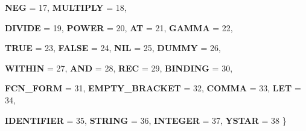 \begin{DoxyCompactItemize}
{\bfseries NEG} =  17, 
{\bfseries MULTIPLY} =  18, 
\par
{\bfseries DIVIDE} =  19, 
{\bfseries POWER} =  20, 
{\bfseries AT} =  21, 
{\bfseries GAMMA} =  22, 
\par
{\bfseries TRUE} =  23, 
{\bfseries FALSE} =  24, 
{\bfseries NIL} =  25, 
{\bfseries DUMMY} =  26, 
\par
{\bfseries WITHIN} =  27, 
{\bfseries AND} =  28, 
{\bfseries REC} =  29, 
{\bfseries BINDING} =  30, 
\par
{\bfseries FCN\_\-FORM} =  31, 
{\bfseries EMPTY\_\-BRACKET} =  32, 
{\bfseries COMMA} =  33, 
{\bfseries LET} =  34, 
\par
{\bfseries IDENTIFIER} =  35, 
{\bfseries STRING} =  36, 
{\bfseries INTEGER} =  37, 
{\bfseries YSTAR} =  38
 \}
\end{DoxyCompactItemize}
